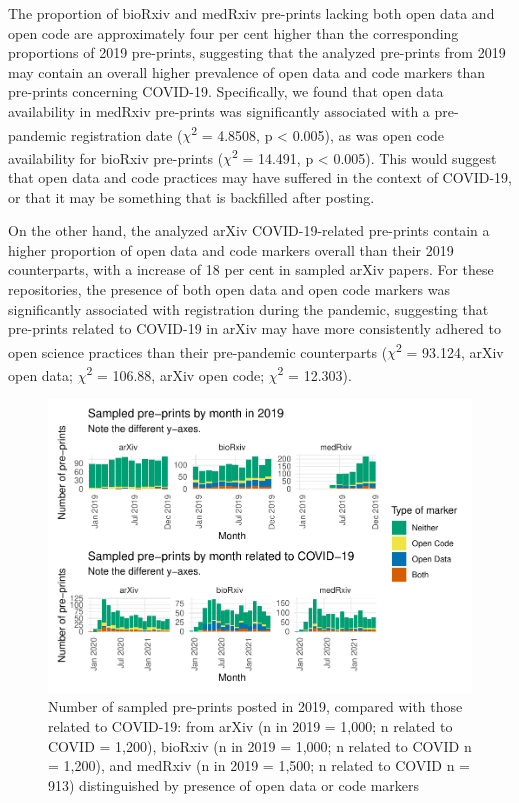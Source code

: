 \documentclass[
]{article}
\begin{document}
The proportion of bioRxiv and medRxiv pre-prints lacking both open data and open code are approximately four per cent higher than the corresponding proportions of 2019 pre-prints, suggesting that the analyzed pre-prints from 2019 may contain an overall higher prevalence of open data and code markers than pre-prints concerning COVID-19. Specifically, we found that open data availability in medRxiv pre-prints was significantly associated with a pre-pandemic registration date (\(\chi\)\textsuperscript{2} = 4.8508, p \textless{} 0.005), as was open code availability for bioRxiv pre-prints (\(\chi\)\textsuperscript{2} = 14.491, p \textless{} 0.005). This would suggest that open data and code practices may have suffered in the context of COVID-19, or that it may be something that is backfilled after posting.

On the other hand, the analyzed arXiv COVID-19-related pre-prints contain a higher proportion of open data and code markers overall than their 2019 counterparts, with a increase of 18 per cent in sampled arXiv papers. For these repositories, the presence of both open data and open code markers was significantly associated with registration during the pandemic, suggesting that pre-prints related to COVID-19 in arXiv may have more consistently adhered to open science practices than their pre-pandemic counterparts (\(\chi\)\textsuperscript{2} = 93.124, arXiv open data; \(\chi\)\textsuperscript{2} = 106.88, arXiv open code; \(\chi\)\textsuperscript{2} = 12.303).

\begin{figure}

{\centering \includegraphics[width=0.9\linewidth]{paper_files/figure-latex/arxiv-and-monthly-papers-condition-stack-1} 

}

\caption{Number of sampled pre-prints posted in 2019, compared with those related to COVID-19: from arXiv (n in 2019 = 1,000; n related to COVID = 1,200), bioRxiv (n in 2019 = 1,000; n related to COVID n = 1,200), and medRxiv (n in 2019 = 1,500; n related to COVID n = 913) distinguished by presence of open data or code markers}\label{fig:arxiv-and-monthly-papers-condition-stack}
\end{figure}
\end{document}

